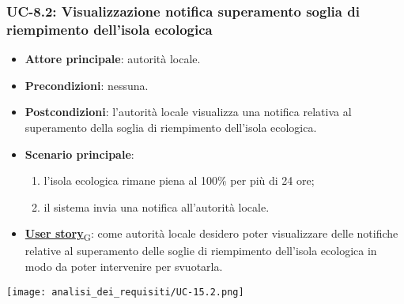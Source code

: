 \subsubsection{UC-8.2: Visualizzazione notifica superamento soglia di riempimento dell'isola ecologica}
\begin{itemize}
	\item \textbf{Attore principale}: autorità locale.
	\item \textbf{Precondizioni}: nessuna.
	\item \textbf{Postcondizioni}: l'autorità locale visualizza una notifica relativa al superamento della soglia di riempimento dell'isola ecologica.
	\item \textbf{Scenario principale}:
	      \begin{enumerate}
		      \item l'isola ecologica rimane piena al 100\% per più di 24 ore;
		      \item il sistema invia una notifica all'autorità locale.
	      \end{enumerate}
	\item \href{https://7last.github.io/docs/pb/documentazione-interna/glossario\#user-story}{\textbf{User story}\textsubscript{G}}:
	      come autorità locale desidero poter visualizzare delle notifiche relative al superamento delle soglie di riempimento dell'isola ecologica
	      in modo da poter intervenire per svuotarla.
\end{itemize}
\begin{center}
	\texttt{[image: analisi\_dei\_requisiti/UC-15.2.png]}
\end{center}


